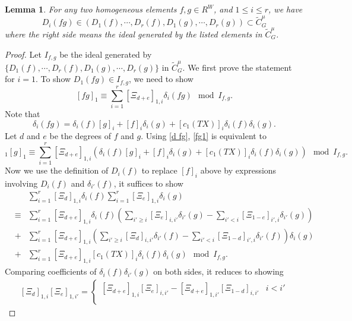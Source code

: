\documentclass[reqno]{amsart}
\numberwithin{equation}{subsection}
\newtheorem{lemma}[subsubsection]{Lemma}
\theoremstyle{definition}
\newcommand{\wt}[1]{\widetilde{#1}}
\renewcommand\d\delta
\begin{document}
\begin{lemma}\label{l:Difg}
For any two homogeneous elements $f,g\in R^W$, and $1\le i\le r$, we have
\begin{equation*}
    D_i(fg)\in (D_1(f),\cdots, D_r(f), D_1(g),\cdots, D_r(g))\subset \wt C^\mu_G
\end{equation*}
where the right side means the ideal generated by the listed elements in $\wt C^\mu_G$.
\end{lemma}
\begin{proof}
    Let $I_{f,g}$ be the ideal generated by $\{D_1(f),\cdots, D_r(f), D_1(g),\cdots, D_r(g)\}$ in $\wt C^\mu_G$. We first prove the statement for $i=1$. To show $D_1(fg)\in I_{f,g}$, we need to show
    \begin{equation}\label{fg1}
        [fg]_1\equiv \sum_{i=1}^r[\Xi_{d+e}]_{1,i}\d_i(fg)\mod I_{f,g}.
    \end{equation}
    Note that
    \begin{equation}\label{d fg}
        \d_i(fg)=\d_i(f)[g]_i+[f]_i\d_i(g)+[c_1(TX)]_i\d_i(f)\d_i(g).
    \end{equation}
    Let $d$ and $e$ be the degrees of $f$ and $g$. Using \eqref{d fg}, \eqref{fg1} is equivalent to
    \begin{equation*}
    [f]_1[g]_1\equiv\sum_{i=1}^r[\Xi_{d+e}]_{1,i}\left(\d_i(f)[g]_i+[f]_i\d_i(g)+[c_1(TX)]_i\d_i(f)\d_i(g)\right)\mod I_{f,g}.
    \end{equation*}
    Now we use the definition of $D_i(f)$ to replace $[f]_i$ above by expressions involving $D_i(f)$ and $\d_{i'}(f)$, it suffices to show
    \begin{eqnarray*}
        &&\sum_{i=1}^r[\Xi_d]_{1,i}\d_i(f)\sum_{i=1}^r[\Xi_e]_{1,i}\d_i(g)\\
        &\equiv& \sum_{i=1}^r[\Xi_{d+e}]_{1,i}\d_i(f)\left(\sum_{i'\ge i}[\Xi_e]_{i,i'}\d_{i'}(g)-\sum_{i'< i}[\Xi_{1-e}]_{i',i}\d_{i'}(g)\right)\\
        &+&\sum_{i=1}^r[\Xi_{d+e}]_{1,i}\left(\sum_{i'\ge i}[\Xi_d]_{i,i'}\d_{i'}(f)-\sum_{i'< i}[\Xi_{1-d}]_{i',i}\d_{i'}(f)\right)\d_i(g)\\
        &+&\sum_{i=1}^r[\Xi_{d+e}]_{1,i}[c_1(TX)]_i\d_i(f)\d_i(g)\mod I_{f,g}.
    \end{eqnarray*}
    Comparing coefficients of $\d_i(f)\d_{i'}(g)$ on both sides, it reduces to showing
    \begin{eqnarray}\label{Xi prod}
        [\Xi_d]_{1,i}[\Xi_e]_{1,i'}=\begin{cases}
            [\Xi_{d+e}]_{1,i}[\Xi_{e}]_{i,i'}-[\Xi_{d+e}]_{1,i'}[\Xi_{1-d}]_{i,i'} & i<i'\\

\end{cases}
\end{eqnarray}
\end{proof}
\end{document}
